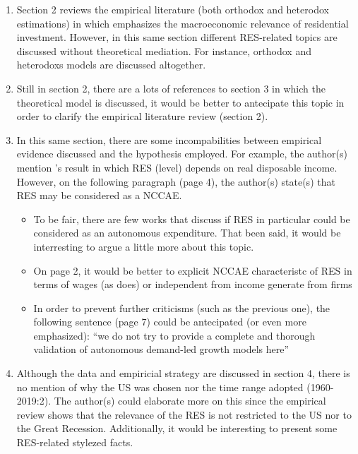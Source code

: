 \documentclass[11pt]{article}
\begin{document}
\begin{enumerate}
\item Section 2 reviews the empirical literature (both orthodox and heterodox estimations) in which emphasizes the macroeconomic relevance of residential investment. However, in this same section different RES-related topics are discussed without theoretical mediation. For instance, orthodox and heterodoxs models are discussed altogether.
\item Still in section 2, there are a lots of references to section 3 in which the theoretical model is discussed, it would be better to antecipate this topic in order to clarify the empirical literature review (section 2).
\item In this same section, there are some incompabilities between empirical evidence discussed and the hypothesis employed. For example, the author(s) mention \citeauthor*{arestis_economic_2019}'s \citeyear{arestis_economic_2019} result in which RES (level) depends on real disposable income. However, on the following paragraph (page 4), the author(s) state(s) that RES may be considered as a NCCAE.

\begin{itemize}
\item To be fair, there are few works that discuss if RES in particular could be considered as an autonomous expenditure. That been said, it would be interresting to argue a little more about this topic.

\item On page 2, it would be better to explicit NCCAE characteristc of RES in terms of wages (as \textcite{serrano_long_1995} does) or independent from income generate from firms

\item In order to prevent further criticisms (such as the previous one), the following sentence (page 7) could be antecipated (or even more emphasized): ``we do not try to provide a complete and thorough validation of autonomous demand-led growth models here''
\end{itemize}

\item Although the data and empiricial strategy are discussed in section 4, there is no mention of why the US was chosen nor the time range adopted (1960-2019:2). The author(s) could elaborate more on this since the empirical review shows that the relevance of the RES is not restricted to the US nor to the Great Recession. Additionally, it would be interesting to present some RES-related stylezed facts.


\end{enumerate}
\end{document}
